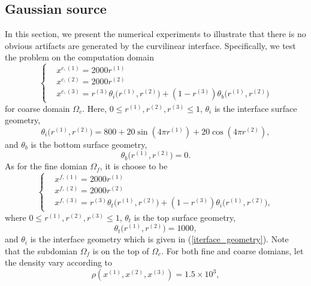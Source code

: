 \documentclass[a4paper]{article}
\begin{document}
\subsection{Gaussian source}\label{gaussian_source}
In this section, we present the numerical experiments to illustrate that there is no obvious artifacts are generated by the curvilinear interface. Specifically, we test the problem on the computation domain
\begin{equation}
\left\{
\begin{aligned}
& x^{c,(1)} = 2000 r^{(1)}\\
& x^{c,(2)} = 2000 r^{(2)}\\
& x^{c,(3)} = r^{(3)} \theta_i\big(r^{(1)},r^{(2)}\big) + (1-r^{(3)}) \theta_b\big(r^{(1)},r^{(2)}\big)
\end{aligned}
\right.
\end{equation}
for coarse domain $\Omega_c$. Here, $0\leq r^{(1)}, r^{(2)}, r^{(3)}\leq 1$, $\theta_i$ is the interface surface geometry,
\begin{equation}
\theta_i\big(r^{(1)},r^{(2)}\big) = 800+20\sin(4\pi r^{(1)})+20\cos(4\pi r^{(2)}),
\end{equation}
and 
$\theta_b$ is the bottom surface geometry,
\begin{equation}
\theta_b\big(r^{(1)},r^{(2)}\big) = 0.
\end{equation}
As for the fine domian $\Omega_f$, it is choose to be
\begin{equation}
\left\{
\begin{aligned}
& x^{f,(1)} = 2000 r^{(1)}\\
& x^{f,(2)} = 2000 r^{(2)}\\
& x^{f,(3)} = r^{(3)}\theta_t\big(r^{(1)},r^{(2)}\big) + (1-r^{(3)})\theta_i\big(r^{(1)},r^{(2)}\big),
\end{aligned}
\right.
\end{equation}
where $0\leq r^{(1)}, r^{(2)}, r^{(3)}\leq 1$, $\theta_t$ is the top surface geometry,
\begin{equation}
\theta_t\big(r^{(1)},r^{(2)}\big) = 1000,
\end{equation}
and $\theta_i$ is the interface geometry which is given in (\ref{iterface_geometry}). Note that the subdomian 
$\Omega_f$ is on the top of $\Omega_c$. For both fine and coarse domians, let the density vary according to
\begin{equation}
\rho(x^{(1)},x^{(2)},x^{(3)}) = 1.5\times 10^3,
\end{equation}
\end{document}
